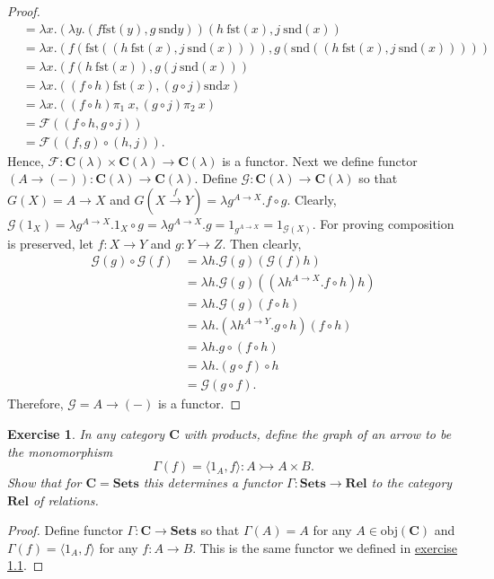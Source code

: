 \documentclass[a4paper, 11pt]{book}
\theoremstyle{plain}
\newtheorem{exercise}{Exercise}[chapter]
\theoremstyle{plain}
\newcommand{\mb}{\mathbf}
\newcommand{\arr}{\rightarrow}
\newcommand{\obj}{\text{obj}}
\newcommand{\mc}{\mathcal}
\newcommand{\warr}{\xrightarrow}
\newcommand{\C}{\mathbf{C}}
\newcommand{\F}{\mc{F}}
\newcommand{\G}{\mc{G}}
\newcommand{\mon}{\rightarrowtail}
\newcommand{\la}{\langle}
\newcommand{\ra}{\rangle}
\newcommand{\fst}{\text{fst}}
\newcommand{\snd}{\text{snd}}
\begin{document}
\begin{proof}
\begin{align*}
      &= \lambda x. (\lambda y. (f \fst(y), g ~ \snd y)) (h ~ \fst (x), j ~ \snd(x)) \\
      &=\lambda x. (f(\fst( (h ~ \fst (x), j ~ \snd(x)))), g(\snd((h ~ \fst (x), j ~ \snd(x))))) \\
      &= \lambda x. (f (h ~ \fst (x)), g(j ~ \snd (x))) \\
      &= \lambda x. ( (f \circ h) \fst(x), (g \circ j) \snd x) \\
      &= \lambda x. ( (f \circ h) \pi_1 ~ x, (g \circ j) \pi_2 ~ x) \\
      &=\F((f \circ h, g \circ j)) \\
      &= \F ((f,g) \circ (h,j)).
    \end{align*} 
    Hence, $\F: \C(\lambda) \times \C(\lambda) \arr \C(\lambda)$ is a functor. Next we define functor $(A \arr (-)): \C(\lambda) \arr \C(\lambda)$. Define $\G:\C(\lambda) \arr \C(\lambda)$ so that $G(X)=A \arr X$ and $G(X \warr{f} Y) = \lambda g^{A \arr X}. f \circ g$. Clearly, $\G(1_X)=\lambda g^{A \arr X}. 1_X \circ g=\lambda g^{A \arr X}.g=1_{g^{A \arr X}}=1_{\G(X)}$. For proving composition is preserved, let $f:X \arr Y$ and $g:Y \arr Z$. Then clearly, 
    \begin{align*}
      \G(g) \circ \G(f) &= \lambda h. \G(g) (\G(f) h) \\
      &= \lambda h. \G(g) ( (\lambda h^{A \arr X}. f \circ h) h) \\
      &= \lambda h. \G(g) (f \circ h) \\
      &= \lambda h. (\lambda h^{A \arr Y}. g \circ h ) (f \circ h) \\
      &= \lambda h. g \circ (f \circ h) \\
      &=\lambda h. (g \circ f) \circ h \\
      &=\G(g \circ f).
    \end{align*}
    Therefore, $\G=A \arr (-)$ is a functor.

  \end{proof}
  \begin{exercise}
    In any category $\mb{C}$ with products, define the graph of an arrow to be the monomorphism $$\Gamma(f)=\la 1_A, f \ra : A \mon A \times B.$$ Show that for $\mb{C}=\mb{Sets}$ this determines a functor $\Gamma: \mb{Sets} \arr \mb{Rel}$ to the category $\mb{Rel}$ of relations. 
  \end{exercise}
  \begin{proof}
    Define functor $\Gamma:\mb{C} \arr \mb{Sets}$ so that $\Gamma(A)=A$ for any $A \in \obj(\C)$ and $\Gamma(f)=\la 1_A, f \ra$ for any $f:A \arr B$. This is the same functor we defined in \hyperref[sec:ex1ch1] {exercise 1.1}.
  \end{proof}
\end{document}
